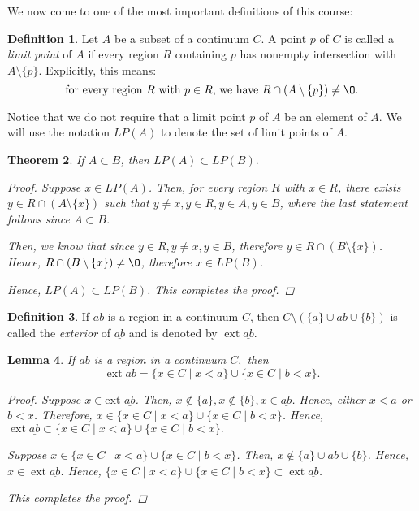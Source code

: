 \documentclass[11pt]{article}
\renewcommand{\emptyset}{\O}
\renewcommand{\_}[1]{\underline{ #1 }}
\DeclareMathOperator{\ext}{ext}
\newtheorem{theorem}{Theorem}[section]
\newtheorem{lemma}[theorem]{Lemma}
\theoremstyle{definition}
\newtheorem{definition}[theorem]{Definition}
\numberwithin{equation}{subsection}
\begin{document}
We now come to one of the most important definitions of this course:

\begin{definition}
Let $A$ be a subset of a continuum $C$.  A point $p$ of $C$ is called a \emph{limit point} of $A$ if every region $R$ containing $p$ has nonempty intersection with $A \setminus \{p\}$.  Explicitly, this means:
\[
\text{for every region $R$ with $p \in R$, we have $R \cap (A \setminus \{p \}) \neq \emptyset$.}
\]
\end{definition}

Notice that we do not require that a limit point $p$ of $A$ be an element of $A$. We will use the notation $LP(A)$ to denote the set of limit points of $A.$ 

\begin{theorem} If $A \subset B$, then $LP(A)\subset LP(B).$

\begin{proof}
Suppose $x \in LP(A)$. Then, for every region $R$ with $x \in R$, there exists $y \in R \cap (A \setminus \{x\})$ such that $y \not = x, y \in R, y \in A, y\in B$, where the last statement follows since $A \subset B$.

Then, we know that since $y \in R, y \not = x, y \in B$, therefore $ y \in R 
 \cap (B \setminus \{x\})$. Hence, $R 
 \cap (B \setminus \{x\}) \not = \emptyset$, therefore $x \in LP(B)$.

Hence, $LP(A) \subset LP(B)$. This completes the proof.

\renewcommand\qedsymbol{QED}
\end{proof}

\end{theorem}



\begin{definition} If $\_{ab}$ is a region in a continuum $C$, then $C \setminus (\{a\} \cup \_{ab} \cup \{b\})$ is called the \emph{exterior} of $\_{ab}$ and is denoted by $\ext{\_{ab}}$.
\end{definition}


\begin{lemma} If $\_{ab}$ is a region in a continuum $C,$ then
$$\ext{\_{ab}}=\{x\in C\mid x<a\}\cup\{x\in C\mid b<x\}.$$

\begin{proof}
Suppose $x \in \text{ext } \_{ab}$. Then, $x \notin \{a\}, x \notin \{b\}, x \in \_{ab}$. Hence, either $x<a$ or $b<x$. Therefore, $x \in \{x\in C\mid x<a\}\cup\{x\in C\mid b<x\}$. Hence, $\ext{\_{ab}} \subset \{x\in C\mid x<a\}\cup\{x\in C\mid b<x\}.$

Suppose $x \in \{x\in C\mid x<a\}\cup\{x\in C\mid b<x\}$. Then, $x \notin \{a\} \cup \_{ab} \cup \{b\}$. Hence, $x \in \ext{\_{ab}}$. Hence, $\{x\in C\mid x<a\}\cup\{x\in C\mid b<x\} \subset \ext{\_{ab}}$.

This completes the proof.

\renewcommand\qedsymbol{QED}
\end{proof}
\end{lemma}
\end{document}
